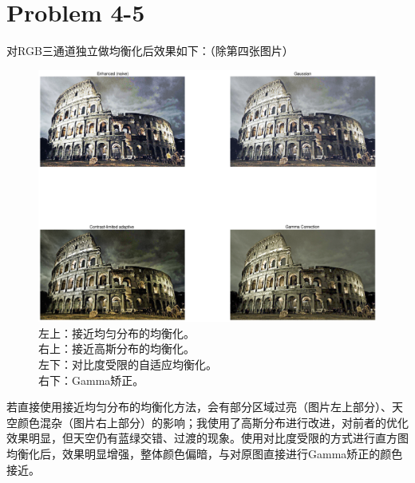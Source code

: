 \documentclass[fontset=macnew]{article}
\begin{document}
\section*{Problem 4-5}
对RGB三通道独立做均衡化后效果如下：（除第四张图片）
\begin{figure}[htpb]
	\centering
	\includegraphics[width=\linewidth]{rgb.eps}
	\caption{左上：接近均匀分布的均衡化。\\右上：接近高斯分布的均衡化。\\左下：对比度受限的自适应均衡化。\\右下：Gamma矫正。}%
	\label{fig:rgb}
\end{figure}

若直接使用接近均匀分布的均衡化方法，会有部分区域过亮（图片左上部分）、天空颜色混杂（图片右上部分）的影响；我使用了高斯分布进行改进，对前者的优化效果明显，但天空仍有蓝绿交错、过渡的现象。使用对比度受限的方式进行直方图均衡化后，效果明显增强，整体颜色偏暗，与对原图直接进行Gamma矫正的颜色接近。
\end{document}
